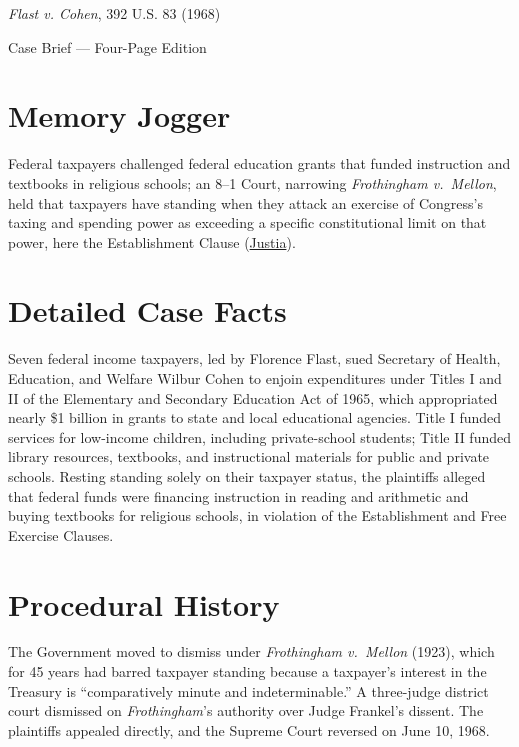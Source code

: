 \documentclass[12pt]{article}
\begin{document}
\begin{center}
{\LARGE \textit{Flast v. Cohen}, 392 U.S. 83 (1968)\par}
\vspace{0.8em}
{\large Case Brief --- Four-Page Edition\par}
\end{center}
\vspace{1em}

\section{Memory Jogger}

Federal taxpayers challenged federal education grants that funded instruction and textbooks in religious schools; an 8--1 Court, narrowing \textit{Frothingham v.\ Mellon}, held that taxpayers have standing when they attack an exercise of Congress's taxing and spending power as exceeding a specific constitutional limit on that power, here the Establishment Clause (\href{https://supreme.justia.com/cases/federal/us/392/83/}{Justia}).

\section{Detailed Case Facts}

Seven federal income taxpayers, led by Florence Flast, sued Secretary of Health, Education, and Welfare Wilbur Cohen to enjoin expenditures under Titles I and II of the Elementary and Secondary Education Act of 1965, which appropriated nearly \$1 billion in grants to state and local educational agencies. Title I funded services for low-income children, including private-school students; Title II funded library resources, textbooks, and instructional materials for public and private schools. Resting standing solely on their taxpayer status, the plaintiffs alleged that federal funds were financing instruction in reading and arithmetic and buying textbooks for religious schools, in violation of the Establishment and Free Exercise Clauses.

\section{Procedural History}

The Government moved to dismiss under \textit{Frothingham v.\ Mellon} (1923), which for 45 years had barred taxpayer standing because a taxpayer's interest in the Treasury is ``comparatively minute and indeterminable.'' A three-judge district court dismissed on \textit{Frothingham}'s authority over Judge Frankel's dissent. The plaintiffs appealed directly, and the Supreme Court reversed on June 10, 1968.
\end{document}
